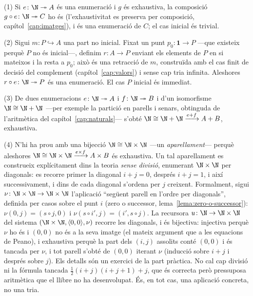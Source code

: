 \begin{prova}
(1) Si \(e\colon\N\twoheadrightarrow A\) és una enumeració i \(g\) és
exhaustiva, la composició \(g\circ e\colon\N\twoheadrightarrow C\) ho és
(l'exhaustivitat es preserva per composició, capítol~\ref{cap:imatges}),
i és una enumeració de \(C\); el cas inicial és trivial.

(2) Sigui \(m\colon P\hookrightarrow A\) una part no inicial. Fixat un punt
\(p_0\colon\mathbf1\to P\) ---que existeix perquè \(P\) no és inicial---,
definim \(r\colon A\to P\) enviant els elements de \(P\) en si mateixos i
la resta a \(p_0\); això és una retracció de \(m\), construïda amb el cas
finit de decisió del complement (capítol~\ref{cap:valors}) i sense cap
tria infinita. Aleshores \(r\circ e\colon\N\twoheadrightarrow P\) és una
enumeració. El cas \(P\) inicial és immediat.

(3) De dues enumeracions \(e\colon\N\twoheadrightarrow A\) i
\(f\colon\N\twoheadrightarrow B\) i d'un isomorfisme
\(\N\cong\N+\N\) ---per exemple la partició en parells i senars, obtinguda
de l'aritmètica del capítol~\ref{cap:naturals}--- s'obté
\(\N\cong\N+\N\xrightarrow{e+f}A+B\), exhaustiva.

(4) N'hi ha prou amb una bijecció \(\N\cong\N\times\N\) ---un
\emph{aparellament}--- perquè aleshores
\(\N\cong\N\times\N\xrightarrow{e\times f}A\times B\) és exhaustiva. Un tal
aparellament es construeix explícitament dins la teoria \emph{sense divisió},
enumerant \(\N\times\N\) per diagonals: es recorre primer la diagonal
\(i+j=0\), després \(i+j=1\), i així successivament, i dins de cada diagonal
s'ordena per \(j\) creixent. Formalment, sigui \(\nu\colon\N\times\N\to\N\times\N\) l'aplicació
\enquote{següent parell en l'ordre per diagonals}, definida per casos
sobre el punt \(i\) (zero o successor, lema~\ref{lema:zero-o-successor}):
\(\nu(0,j)=(s\circ j,0)\) i \(\nu(s\circ i',j)=(i',s\circ j)\). La recursora
\(u\colon\N\to\N\times\N\) del sistema \((\N\times\N,\langle0,0\rangle,\nu)\)
recorre les diagonals, i és bijectiva: injectiva perquè \(\nu\) ho és i
\((0,0)\) no és a la seva imatge (el mateix argument que a les equacions
de Peano), i exhaustiva perquè la part dels \((i,j)\) assolits conté
\((0,0)\) i és tancada per \(\nu\), i tot parell s'obté de \((0,0)\)
iterant \(\nu\) (inducció sobre \(i+j\) i després sobre \(j\)). Els detalls
són un exercici de la part pràctica. No cal cap divisió ni la fórmula
tancada \(\tfrac12(i+j)(i+j+1)+j\), que és correcta però pressuposa
aritmètica que el llibre no ha desenvolupat. És, en tot cas, una
aplicació concreta, no una tria.
\end{prova}

